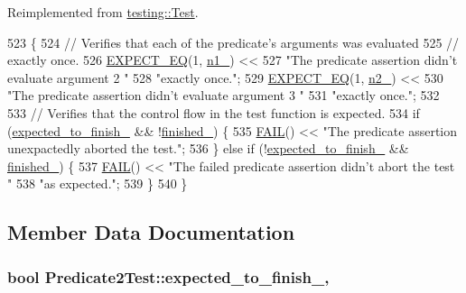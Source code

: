 Reimplemented from \hyperlink{classtesting_1_1Test_a5f0ab439802cbe0ef7552f1a9f791923}{testing\+::\+Test}.


\begin{DoxyCode}
523                           \{
524     \textcolor{comment}{// Verifies that each of the predicate's arguments was evaluated}
525     \textcolor{comment}{// exactly once.}
526     \hyperlink{gtest_8h_a4159019abda84f5366acdb7604ff220a}{EXPECT\_EQ}(1, \hyperlink{classPredicate2Test_ac002d8e279b24e75906fd19973fc2170}{n1\_}) <<
527         \textcolor{stringliteral}{"The predicate assertion didn't evaluate argument 2 "}
528         \textcolor{stringliteral}{"exactly once."};
529     \hyperlink{gtest_8h_a4159019abda84f5366acdb7604ff220a}{EXPECT\_EQ}(1, \hyperlink{classPredicate2Test_a9dbe5173570b9b911af2df889c287027}{n2\_}) <<
530         \textcolor{stringliteral}{"The predicate assertion didn't evaluate argument 3 "}
531         \textcolor{stringliteral}{"exactly once."};
532 
533     \textcolor{comment}{// Verifies that the control flow in the test function is expected.}
534     \textcolor{keywordflow}{if} (\hyperlink{classPredicate2Test_a56cf1f0f556addd9a62e0644dc1a86fc}{expected\_to\_finish\_} && !\hyperlink{classPredicate2Test_a30f4ef76d3004253078e767e5c653b85}{finished\_}) \{
535       \hyperlink{gtest_8h_a3e26a8d27caa386ed0ea7ce9d5b7c4ed}{FAIL}() << \textcolor{stringliteral}{"The predicate assertion unexpactedly aborted the test."};
536     \} \textcolor{keywordflow}{else} \textcolor{keywordflow}{if} (!\hyperlink{classPredicate2Test_a56cf1f0f556addd9a62e0644dc1a86fc}{expected\_to\_finish\_} && \hyperlink{classPredicate2Test_a30f4ef76d3004253078e767e5c653b85}{finished\_}) \{
537       \hyperlink{gtest_8h_a3e26a8d27caa386ed0ea7ce9d5b7c4ed}{FAIL}() << \textcolor{stringliteral}{"The failed predicate assertion didn't abort the test "}
538                 \textcolor{stringliteral}{"as expected."};
539     \}
540   \}
\end{DoxyCode}


\subsection{Member Data Documentation}
\subsubsection[{\texorpdfstring{expected\+\_\+to\+\_\+finish\+\_\+}{expected_to_finish_}}]{\setlength{\rightskip}{0pt plus 5cm}bool Predicate2\+Test\+::expected\+\_\+to\+\_\+finish\+\_\+\hspace{0.3cm}{\ttfamily [static]}, {\ttfamily [protected]}}\hypertarget{classPredicate2Test_a56cf1f0f556addd9a62e0644dc1a86fc}{}\label{classPredicate2Test_a56cf1f0f556addd9a62e0644dc1a86fc}
